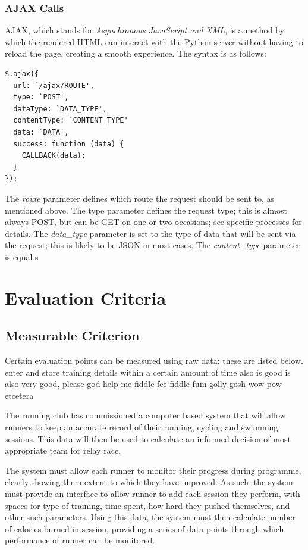 \documentclass{article}[12pt,a4paper]
\begin{document}
\subsubsection{AJAX Calls}
AJAX, which stands for \textit{Asynchronous JavaScript and XML}, is a method by which the rendered HTML can interact with the Python server without having to reload the page, creating a smooth experience. The syntax is as follows:

\begin{verbatim}
$.ajax({
  url: `/ajax/ROUTE',
  type: `POST',
  dataType: `DATA_TYPE',
  contentType: `CONTENT_TYPE'
  data: `DATA',
  success: function (data) {
    CALLBACK(data);
  }
});
\end{verbatim}
The \textit{route} parameter defines which route the request should be sent to, as mentioned above. The 
type parameter defines the request type; this is almost always POST, but can be GET on one or two occasions; see specific processes for details. The \textit{data\_type} parameter is set to the type of data that will be sent via the request; this is likely to be JSON in most cases. The \textit{content\_type} parameter is equal s
 
\section{Evaluation Criteria}
\subsection{Measurable Criterion}
Certain evaluation points can be measured using raw data; these are listed below.
enter and store training details within a certain amount of time
also is good is also very good, please god help me fiddle fee fiddle fum golly gosh wow pow etcetera

The running club has commissioned  a computer based system that will allow runners to keep an accurate record of their running, cycling and swimming sessions. This data will then be used to calculate an informed decision of most appropriate team for relay race.

The system must allow each runner to monitor their progress during programme, clearly showing them extent to which they have improved. As such, the system must provide an interface to allow runner to add each session they perform, with spaces for type of training, time spent, how hard they pushed themselves, and other such parameters. Using this data, the system must then calculate number of calories burned in session, providing a series of data points through which performance of runner can be monitored.
\end{document}
